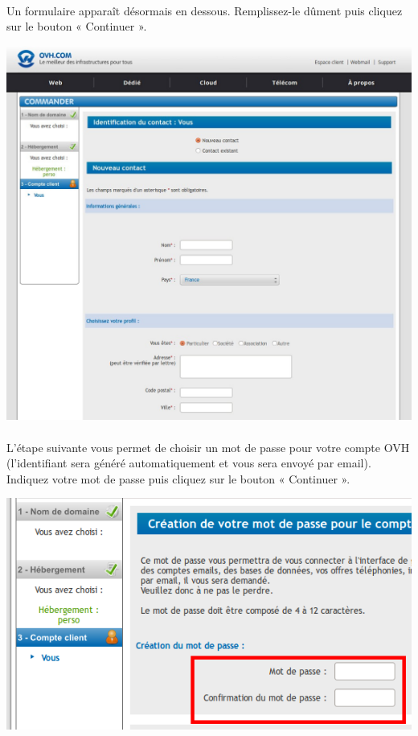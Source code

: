 \documentclass[10pt,a4paper]{article}
\begin{document}
\paragraph{}Un formulaire apparaît désormais en dessous. Remplissez-le dûment puis cliquez sur le bouton « Continuer ».
\begin{center}
\includegraphics[scale=0.3]{img/0280.png}
\end{center}
\newpage
\paragraph{}L'étape suivante vous permet de choisir un mot de passe pour votre compte OVH (l'identifiant sera généré automatiquement et vous sera envoyé par email). Indiquez votre mot de passe puis cliquez sur le bouton « Continuer ».
\begin{center}
\includegraphics[scale=0.3]{img/0281.png}
\end{center}
\end{document}
